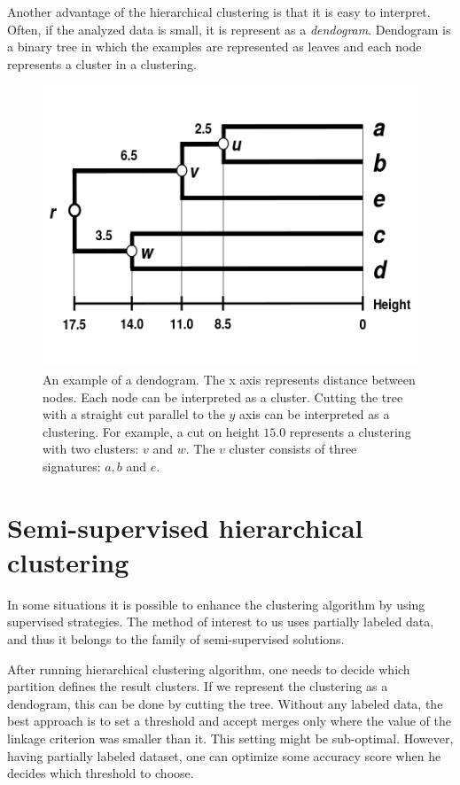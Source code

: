 \documentclass{pracamgr}
\begin{document}
Another advantage of the hierarchical clustering is that it is easy to interpret. Often,
if the analyzed data is small, it is represent as a \textit{dendogram}. Dendogram
is a binary tree in which the examples are represented as leaves and each node represents
a cluster in a clustering.

\begin{figure}[!ht]
\includegraphics[width=\textwidth]{figures/Dendogram}
\caption{An example of a dendogram. The x axis represents distance between nodes. Each node
can be interpreted as a cluster. Cutting the tree with a straight cut parallel to the $y$ axis
can be interpreted as a clustering. For example, a cut on height $15.0$ represents a
clustering with two clusters: $v$ and $w$. The $v$ cluster consists of three signatures: $a,b$ and $e$.}
\label{fig:den}
\end{figure}

\section{Semi-supervised hierarchical clustering}
In some situations it is possible to enhance the clustering algorithm by using supervised
strategies. The method of interest to us uses partially labeled data, and thus it
belongs to the family of semi-supervised solutions.

After running hierarchical clustering algorithm, one needs to decide which partition
defines the result clusters. If we represent the clustering as a dendogram, this can
be done by cutting the tree. Without any labeled data, the best approach is to
set a threshold and accept merges only where the value of the linkage criterion was smaller
than it. This setting might be sub-optimal. However, having partially labeled dataset, one can
optimize some accuracy score when he decides which threshold to choose.
\end{document}
